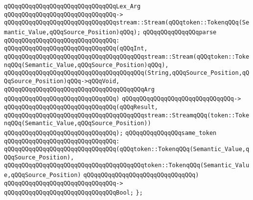 \verb|qQQqqQQqqQQqqQQqqQQqqQQqqQQqqQQqLex_Arg|\newline
\verb|qQQqqQQqqQQqqQQqqQQqqQQqqQQqqQQq->|\newline
\verb|qQQqqQQqqQQqqQQqqQQqqQQqqQQqqQQqstream::Stream(qQQqtoken::TokenqQQq(Semantic_Value,qQQqSource_Position)qQQq);|\newline
\newline
\verb|qQQqqQQqqQQqqQQqparse|\newline
\verb|qQQqqQQqqQQqqQQqqQQqqQQqqQQqqQQq:|\newline
\verb|qQQqqQQqqQQqqQQqqQQqqQQqqQQqqQQq(qQQqInt,|\newline
\verb|qQQqqQQqqQQqqQQqqQQqqQQqqQQqqQQqqQQqqQQqstream::Stream(qQQqtoken::TokenqQQq(Semantic_Value,qQQqSource_Position)qQQq),|\newline
\verb|qQQqqQQqqQQqqQQqqQQqqQQqqQQqqQQqqQQqqQQq(String,qQQqSource_Position,qQQqSource_Position)qQQq->qQQqVoid,|\newline
\verb|qQQqqQQqqQQqqQQqqQQqqQQqqQQqqQQqqQQqqQQqArg|\newline
\verb|qQQqqQQqqQQqqQQqqQQqqQQqqQQqqQQq)|\newline
\verb|qQQqqQQqqQQqqQQqqQQqqQQqqQQqqQQq->|\newline
\verb|qQQqqQQqqQQqqQQqqQQqqQQqqQQqqQQq(qQQqResult,|\newline
\verb|qQQqqQQqqQQqqQQqqQQqqQQqqQQqqQQqqQQqqQQqstream::StreamqQQq(token::TokenqQQq(Semantic_Value,qQQqSource_Position))|\newline
\verb|qQQqqQQqqQQqqQQqqQQqqQQqqQQqqQQq);|\newline
\newline
\verb|qQQqqQQqqQQqqQQqsame_token|\newline
\verb|qQQqqQQqqQQqqQQqqQQqqQQqqQQqqQQq:|\newline
\verb|qQQqqQQqqQQqqQQqqQQqqQQqqQQqqQQq(qQQqtoken::TokenqQQq(Semantic_Value,qQQqSource_Position),|\newline
\verb|qQQqqQQqqQQqqQQqqQQqqQQqqQQqqQQqqQQqqQQqtoken::TokenqQQq(Semantic_Value,qQQqSource_Position)|\newline
\verb|qQQqqQQqqQQqqQQqqQQqqQQqqQQqqQQq)|\newline
\verb|qQQqqQQqqQQqqQQqqQQqqQQqqQQqqQQq->|\newline
\verb|qQQqqQQqqQQqqQQqqQQqqQQqqQQqqQQqBool;|\newline
\verb|};|\newline
\newline

